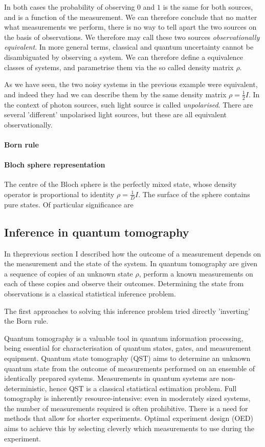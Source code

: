 In both cases the probability of observing $0$ and $1$ is the same for both sources, and is a function of the measurement. We can therefore conclude that no matter what measurements we perform, there is no way to tell apart the two sources on the basis of observations. We therefore may call these two sources \emph{observationally equivalent}.  In more general terms, classical and quantum uncertainty cannot be disambiguated by observing a system. We can therefore define a equivalence classes of systems, and parametrise them via the so called density matrix $\rho$.

As we have seen, the two noisy systems in the previous example were equivalent, and indeed they had we can describe them by the same density matrix $\rho=\frac{1}{2}I$. In the context of photon sources, such light source is called \emph{unpolarised}. There are several 'different' unpolarised light sources, but these are all equivalent observationally.

\paragraph{Born rule}

\paragraph{Bloch sphere representation} The centre of the Bloch sphere is the perfectly mixed state, whose density operator is proportional to identity $\rho=\frac{1}{D}I$. The surface of the sphere contains pure states. Of particular significance are 

\subsection{Inference in quantum tomography}

In theprevious section I described how the outcome of a measurement depends on the measurement and the state of the system. In quantum tomography are given a sequence of copies of an unknown state $\rho$, perform a known measurements on each of these copies and observe their outcomes. Determining the state from observations is a classical statistical inference problem.

The first approaches to solving this inference problem tried directly 'inverting' the Born rule.	

Quantum tomography is a valuable tool in quantum information processing, being essential for characterisation of quantum states, gates, and measurement equipment.  Quantum state tomography (QST) aims to determine an unknown quantum state from the outcome of measurements performed on an ensemble of identically prepared systems. Measurements in quantum systems are non-deterministic, hence QST is a classical statistical estimation problem. Full tomography is inherently resource-intensive: even in moderately sized systems, the number of measurements required is often prohibitive.
There is a need for methods that allow for shorter experiments. Optimal experiment design (OED) aims to achieve this by selecting cleverly which measurements to use during the experiment.

